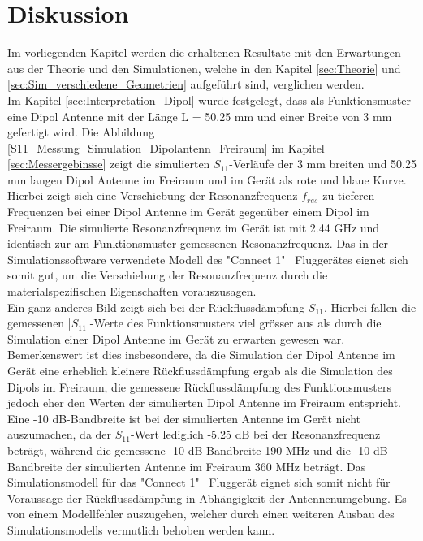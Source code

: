 \chapter{Diskussion}
 Im vorliegenden Kapitel werden  die erhaltenen Resultate mit den Erwartungen aus der Theorie und den Simulationen, welche in den Kapitel \ref{sec:Theorie}
 und \ref{sec:Sim_verschiedene_Geometrien}
 aufgeführt sind, verglichen werden.\\
Im Kapitel \ref{sec:Interpretation_Dipol} wurde festgelegt, dass als Funktionsmuster eine Dipol Antenne mit der Länge L = 50.25 mm und einer Breite von 3 mm gefertigt wird. Die Abbildung \ref{S11_Messung_Simulation_Dipolantenn_Freiraum} im Kapitel \ref{sec:Messergebinsse} zeigt die simulierten $S_{11}$-Verläufe der 3 mm breiten und 50.25 mm langen Dipol Antenne im Freiraum und im Gerät als rote und blaue Kurve. Hierbei zeigt sich eine Verschiebung der Resonanzfrequenz $f_{res}$ zu tieferen Frequenzen bei einer Dipol Antenne im Gerät gegenüber einem Dipol im Freiraum. Die simulierte Resonanzfrequenz im Gerät ist mit 2.44 GHz und identisch zur am Funktionsmuster gemessenen Resonanzfrequenz. Das in der Simulationssoftware verwendete Modell des "Connect 1" \ Fluggerätes eignet sich somit gut, um die Verschiebung der Resonanzfrequenz durch die materialspezifischen Eigenschaften vorauszusagen.\\
Ein ganz anderes Bild zeigt sich bei der Rückflussdämpfung $S_{11}$. Hierbei fallen die gemessenen |$S_{11}$|-Werte des Funktionsmusters viel grösser aus als durch die Simulation einer Dipol Antenne im Gerät zu erwarten gewesen war. Bemerkenswert ist dies insbesondere, da die Simulation der Dipol Antenne im Gerät eine erheblich kleinere Rückflussdämpfung ergab als die Simulation des Dipols im Freiraum, die gemessene Rückflussdämpfung des Funktionsmusters jedoch eher den Werten der simulierten Dipol Antenne im Freiraum entspricht. Eine -10 dB-Bandbreite ist bei der simulierten Antenne im Gerät nicht auszumachen, da der $S_{11}$-Wert lediglich -5.25 dB bei der Resonanzfrequenz beträgt, während die gemessene -10 dB-Bandbreite 190 MHz und die -10 dB-Bandbreite der simulierten Antenne im Freiraum 360 MHz beträgt. Das Simulationsmodell für das "Connect 1" \  Fluggerät eignet sich somit nicht für Voraussage der Rückflussdämpfung in Abhängigkeit der Antennenumgebung. Es von einem Modellfehler auszugehen, welcher durch einen weiteren Ausbau des Simulationsmodells vermutlich behoben werden kann.\\
